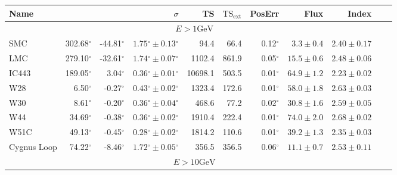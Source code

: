 \documentclass[12pt,preprint]{aastex}
\newcommand{\gev}{\text{GeV}\xspace}
\newcommand{\tsext}{{\ensuremath{\text{TS}_\text{ext}}}\xspace}
\newcommand{\glon}{\text{GLON}\xspace}
\newcommand{\glat}{\text{GLAT}\xspace}
\renewcommand{\deg}{\ensuremath{^\circ}\xspace}
\begin{document}
\clearpage
\begin{table}
    \begin{centering}
      \begin{tabular}{l|rrrrrrrrrr}
        \hline
        \hline
        Name                 &          \glon &          \glat &                    $\sigma$ &         TS &   $\tsext$ &     PosErr &                  Flux &                 Index &                      \\
        \hline
        \multicolumn{10}{c}{$E > 1 \gev$} \\
        \hline
        SMC                  &     302.68\deg &     -44.81\deg & $  1.75\deg \pm   0.13\deg$ &       94.4 &       66.4 &   0.12\deg & $    3.3 \pm     0.4$ & $   2.40 \pm    0.17$ &                      \\
        LMC                  &     279.10\deg &     -32.61\deg & $  1.74\deg \pm   0.07\deg$ &     1102.4 &      861.9 &   0.05\deg & $   15.5 \pm     0.6$ & $   2.48 \pm    0.06$ &                      \\
        IC443                &     189.05\deg &       3.04\deg & $  0.36\deg \pm   0.01\deg$ &    10698.1 &      503.5 &   0.01\deg & $   64.9 \pm     1.2$ & $   2.23 \pm    0.02$ &                      \\
        W28                  &       6.50\deg &      -0.27\deg & $  0.43\deg \pm   0.02\deg$ &     1323.4 &      172.6 &   0.01\deg & $   58.0 \pm     1.8$ & $   2.63 \pm    0.03$ &                      \\
        W30                  &       8.61\deg &      -0.20\deg & $  0.36\deg \pm   0.04\deg$ &      468.6 &       77.2 &   0.02\deg & $   30.8 \pm     1.6$ & $   2.59 \pm    0.05$ &                      \\
        W44                  &      34.69\deg &      -0.38\deg & $  0.36\deg \pm   0.02\deg$ &     1910.4 &      222.4 &   0.01\deg & $   74.0 \pm     2.0$ & $   2.68 \pm    0.02$ &                      \\
        W51C                 &      49.13\deg &      -0.45\deg & $  0.28\deg \pm   0.02\deg$ &     1814.2 &      110.6 &   0.01\deg & $   39.2 \pm     1.3$ & $   2.35 \pm    0.03$ &                      \\
        Cygnus Loop          &      74.22\deg &      -8.46\deg & $  1.72\deg \pm   0.05\deg$ &      356.5 &      356.5 &   0.06\deg & $   11.1 \pm     0.7$ & $   2.53 \pm    0.11$ &                      \\
        \hline
        \multicolumn{10}{c}{$E > 10 \gev$} \\

\end{tabular}
\end{centering}
\end{table}
\end{document}
